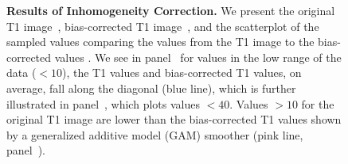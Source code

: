 \begin{figure}
   \hspace*{-0.9em}
\hfill
   \hspace*{-0.9em}
\hfill
   \hspace*{-0.9em}
\hfill
\caption{{\bf Results of Inhomogeneity Correction.}  We present the original T1 image~\protect{}, bias-corrected T1 image~\protect{}, and the scatterplot of the sampled values comparing the values from the T1 image to the bias-corrected values \protect{}.  We see in panel~\protect{} for values in the low range of the data ($< 10$), the T1 values and bias-corrected T1 values, on average, fall along the diagonal (blue line), which is further illustrated in panel~\protect{}, which plots values $< 40$.  Values $> 10$ for the original T1 image are lower than the bias-corrected T1 values shown by a generalized additive model (GAM) smoother (pink line, panel~\protect{}).  }
\label{fig:bias_correct}
\end{figure}

